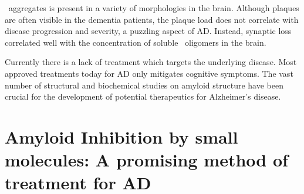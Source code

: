 
\abeta\ aggregates is present in a variety of morphologies in the brain. Although plaques are often visible in the dementia patients, the plaque load does not correlate with disease progression and severity, a puzzling aspect of AD.  Instead, synaptic loss correlated well with the concentration of soluble \abeta\ oligomers in the brain.

Currently there is a lack of treatment which targets the underlying disease. Most approved treatments today for AD only mitigates cognitive symptoms.  The vast number of structural and biochemical studies on amyloid structure have been crucial for the development of potential therapeutics for Alzheimer's disease.




\section{Amyloid Inhibition by small molecules: A promising method of treatment for AD}



